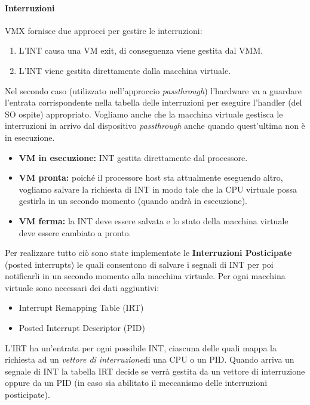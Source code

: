 \documentclass{article}
\begin{document}
\paragraph{Interruzioni}
VMX fornisce due approcci per gestire le interruzioni:
\begin{enumerate}
    \item L’INT causa una VM exit, di conseguenza viene gestita dal VMM.
    \item L’INT viene gestita direttamente dalla macchina virtuale.
\end{enumerate}
Nel secondo caso (utilizzato nell’approccio \textit{passthrough}) l’hardware va a guardare l’entrata corrispondente nella tabella delle interruzioni per eseguire l’handler (del SO ospite) appropriato. Vogliamo anche che la macchina virtuale gestisca le interruzioni in arrivo dal dispositivo \textit{passthrough} anche quando quest’ultima non è in esecuzione.
\begin{itemize}
    \item \textbf{VM in esecuzione:} INT gestita direttamente dal processore.
    \item \textbf{VM pronta:} poiché il processore host sta attualmente eseguendo altro, vogliamo salvare la richiesta di INT in modo tale che la CPU virtuale possa gestirla in un secondo momento (quando andrà in esecuzione).
    \item \textbf{VM ferma:} la INT deve essere salvata e lo stato della macchina virtuale deve essere cambiato a pronto.
\end{itemize}
Per realizzare tutto ciò sono state implementate le \textbf{Interruzioni Posticipate} (posted interrupts) le quali consentono di salvare i segnali di INT per poi notificarli in un secondo momento alla macchina virtuale.
Per ogni macchina virtuale sono necessari dei dati aggiuntivi:
\begin{itemize}
    \item Interrupt Remapping Table (IRT)
    \item Posted Interrupt Descriptor (PID)
\end{itemize}
L’IRT ha un’entrata per ogni possibile INT, ciascuna delle quali mappa la richiesta ad un \textit{vettore di interruzione}\footnotemark  di una CPU o un PID. Quando arriva un segnale di INT la tabella IRT decide se verrà gestita da un vettore di interruzione oppure da un PID (in caso sia abilitato il meccanismo delle interruzioni posticipate).
\end{document}
